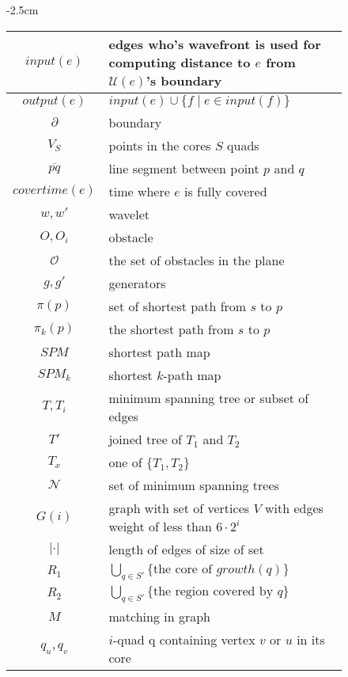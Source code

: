 \begin{figure}
\begin{center}
    \addtolength{\leftskip} {-2.5cm} %
    \addtolength{\rightskip}{-2.5cm}
\begin{tabular}{| c | l |}
    \hline
	$input(e)$ & edges who's wavefront is used for computing distance to $e$ from $\mathcal{U}(e)$'s boundary \\
	\hline
	$output(e)$ & $input(e) \cup \{f \mid e \in input(f)\}$ \\
	\hline
	$\partial$ & boundary \\
	\hline
	$V_S$ & points in the cores $S$ quads \\
	\hline
	$\overline{pq}$ & line segment between point $p$ and $q$ \\
	\hline
	$covertime(e)$ & time where $e$ is fully covered \\
	\hline
	$w,w'$ & wavelet \\
	\hline
	$O, O_i$ & obstacle \\
	\hline
	$\mathcal{O}$ & the set of obstacles in the plane \\
	\hline
	$g,g'$ & generators \\
	\hline
	$\pi(p)$ & set of shortest path from $s$ to $p$ \\
	\hline
	$\pi_k(p)$ & the shortest path from $s$ to $p$ \\
	\hline
	$SPM$ & shortest path map \\
	\hline
	$SPM_k$ & shortest $k$-path map\\
	\hline
	$T, T_i$ & minimum spanning tree or subset of edges \\
	\hline
	$T'$ & joined tree of $T_1$ and $T_2$ \\
	\hline
	$T_x$ & one of $\{T_1, T_2\}$ \\
	\hline
	$\mathcal{N}$ & set of minimum spanning trees \\
	\hline
	$G(i)$ & graph with set of vertices $V$ with edges weight of less than $6 \cdot 2^i$ \\
	\hline
	$|\cdot|$ & length of edges of size of set \\
	\hline
	$R_1$ & $\bigcup_{q \in S'} \{\text{the core of } growth(q)\}$ \\
	\hline
	$R_2$ & $\bigcup_{q \in S'} \{\text{the region covered by } q\}$ \\
	\hline
	$M$ & matching in graph \\
	\hline
	$q_u, q_v$ & $i$-quad q containing vertex $v$ or $u$ in its core \\

\end{tabular}
\end{center}
\end{figure}

